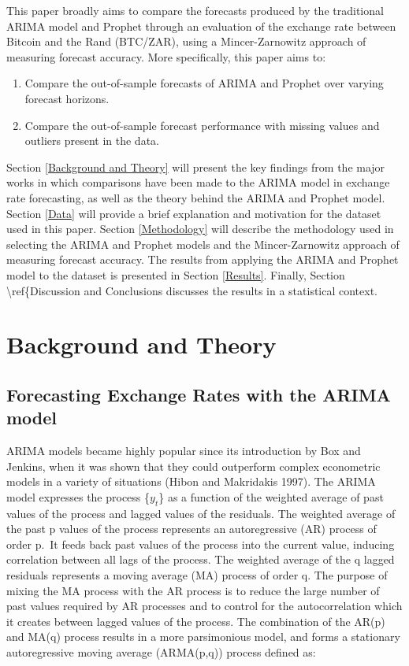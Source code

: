 \documentclass[12pt,a4paper]{article}
\numberwithin{equation}{section}
\numberwithin{figure}{section}
\numberwithin{table}{section}
\begin{document}
This paper broadly aims to compare the forecasts produced by the
traditional ARIMA model and Prophet through an evaluation of the
exchange rate between Bitcoin and the Rand (BTC/ZAR), using a
Mincer-Zarnowitz approach of measuring forecast accuracy. More
specifically, this paper aims to:

\begin{enumerate}
\def\labelenumi{\arabic{enumi}.}
\item
  Compare the out-of-sample forecasts of ARIMA and Prophet over varying
  forecast horizons.
\item
  Compare the out-of-sample forecast performance with missing values and
  outliers present in the data.
\end{enumerate}

Section \ref{Background and Theory} will present the key findings from
the major works in which comparisons have been made to the ARIMA model
in exchange rate forecasting, as well as the theory behind the ARIMA and
Prophet model. Section \ref{Data} will provide a brief explanation and
motivation for the dataset used in this paper. Section \ref{Methodology}
will describe the methodology used in selecting the ARIMA and Prophet
models and the Mincer-Zarnowitz approach of measuring forecast accuracy.
The results from applying the ARIMA and Prophet model to the dataset is
presented in Section \ref{Results}. Finally, Section
\textbackslash{}ref\{Discussion and Conclusions discusses the results in
a statistical context.

\section{\texorpdfstring{Background and Theory
\label{Background and Theory}}{Background and Theory }}\label{background-and-theory}

\subsection{Forecasting Exchange Rates with the ARIMA
model}\label{forecasting-exchange-rates-with-the-arima-model}

ARIMA models became highly popular since its introduction by Box and
Jenkins, when it was shown that they could outperform complex
econometric models in a variety of situations (Hibon and Makridakis
1997). The ARIMA model expresses the process \{\(y_t\)\} as a function
of the weighted average of past values of the process and lagged values
of the residuals. The weighted average of the past p values of the
process represents an autoregressive (AR) process of order p.~It feeds
back past values of the process into the current value, inducing
correlation between all lags of the process. The weighted average of the
q lagged residuals represents a moving average (MA) process of order q.
The purpose of mixing the MA process with the AR process is to reduce
the large number of past values required by AR processes and to control
for the autocorrelation which it creates between lagged values of the
process. The combination of the AR(p) and MA(q) process results in a
more parsimonious model, and forms a stationary autoregressive moving
average (ARMA(p,q)) process defined as:
\end{document}
